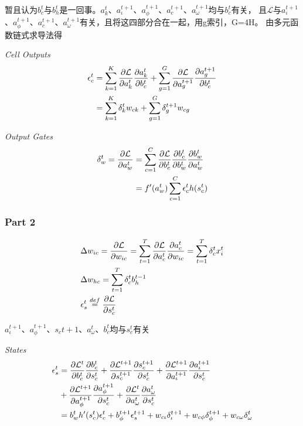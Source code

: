 \documentclass[a4paper,11pt,titlepage,UTF8]{article}
\begin{document}
        暂且认为$b_c^t$与$b_h^t$是一回事。$a_k^t$、$a_\iota^{t+1}$、$a_\phi^{t+1}$、$a_c^{t+1}$、$a_\omega^{t+1}$均与$b_c^t$有关，
        且$\mathcal{L}$与$a_\iota^{t+1}$、$a_\phi^{t+1}$、$a_c^{t+1}$、$a_\omega^{t+1}$有关，且将这四部分合在一起，用g索引，G=4H。
        由多元函数链式求导法得

        \emph{Cell Outputs}
        \begin{align}
        \epsilon_c^t &= \sum_{k=1}^K \frac{\partial \mathcal{L}}{\partial a_k^t} \frac{\partial a_k^t}{\partial b_c^t}
        + \sum_{g=1}^G \frac{\partial \mathcal{L}}{\partial a_g^{t+1}} \frac{\partial a_g^{t+1}}{\partial b_c^t} \notag \\
        &= \sum_{k=1}^K \delta_k^t w_{ck} + \sum_{g=1}^G \delta_g^{t+1} w_{cg}
        \end{align}

        \emph{Output Gates}
        \begin{align}
        \delta_w^t = \frac{\partial \mathcal{L}}{\partial a_w^t}
        &= \sum_{c=1}^C \frac{\partial \mathcal{L}}{\partial b_c^t} \frac{\partial b_c^t}{\partial b_w^t} \frac{\partial b_w^t}{\partial a_w^t} \notag \\
        &= f'(a_w^t)\sum_{c=1}^C \epsilon_c^t h(s_c^t)
        \end{align}

        \subsubsection{Part 2}
        \begin{align}
        & \Delta w_{ic} = \frac{\partial \mathcal{L}}{\partial w_{ic}}
        = \sum_{t=1}^T \frac{\partial \mathcal{L}}{\partial a_c^t}\frac{\partial a_c^t}{\partial w_{ic}}
        = \sum_{t=1}^T \delta_c^t x_i^t \notag \\
        & \Delta w_{hc} = \sum_{t=1}^T \delta_c^t b_h^{t-1} \notag \\
        & \epsilon_s^t\stackrel{def}{=} \frac{\partial \mathcal{L}}{\partial s_c^t} \notag
        \end{align}

        $a_\iota^{t+1}$、$a_\phi^{t+1}$、$s_c{t+1}$、$a_\omega^{t}$、$b_c^t$均与$s_c^t$有关

        \emph{States}
        \begin{align}
        \epsilon_s^t &=  \frac{\partial \mathcal{L}^{t}}{\partial b_c^t} \frac{\partial b_c^{t}}{\partial s_c^t}
        + \frac{\partial \mathcal{L}^{t+1}}{\partial s_c^{t+1}} \frac{\partial s_c^{t+1}}{\partial s_c^t}
        + \frac{\partial \mathcal{L}^{t+1}}{\partial a_\iota^{t+1}} \frac{\partial a_\iota^{t+1}}{\partial s_c^t} \notag  \\
        &+ \frac{\partial \mathcal{L}^{t+1}}{\partial a_\phi^{t+1}} \frac{\partial a_\phi^{t+1}}{\partial s_c^t}
        + \frac{\partial \mathcal{L}^{t}}{\partial a_\omega^{t}} \frac{\partial a_\omega^{t}}{\partial s_c^t}   \notag \\
        &=  b_w^t h'(s_c^t) \epsilon_c^t + b_\phi^{t+1} \epsilon_s^{t+1} + w_{c\iota} \delta_\iota^{t+1} + w_{c\phi} \delta_\phi^{t+1} + w_{c\omega} \delta_\omega^{t}
        \end{align}
\end{document}
